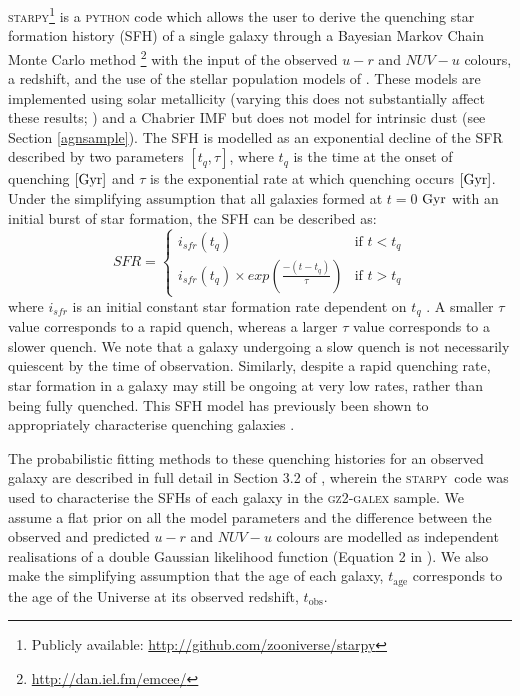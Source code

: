 \documentclass[useAMS,usenatbib]{mn2e}
\def\changed    {\color{nc} }
\def\secondchange    {\color{srv} }
\def\newref    {\color{new} }
\def\starpy ~{\textsc{starpy}}
\begin{document}
\textsc{starpy}\footnote{Publicly available: \url{http://github.com/zooniverse/starpy}} is a \textsc{python} code which allows the user to derive the {\newref quenching} star formation history (SFH) of a single galaxy through a Bayesian Markov Chain Monte Carlo method \citep{Dan}\footnote{\url{http://dan.iel.fm/emcee/}} with the input of the observed $u-r$ and $NUV-u$ colours, a redshift, and the use of the stellar population models of \cite{BC03}. {\changed These models are implemented using solar metallicity (varying this does not substantially affect these results; \citealt{Sme2015}) and a Chabrier IMF \citep{Chab03} {\secondchange but does not model for intrinsic dust (see Section \ref{agnsample})}. The SFH is modelled as an exponential decline of the SFR described by two parameters $[t_q, \tau]$, where $t_q$ is the time at the onset of quenching} $\rm{[Gyr]}$ and $\tau$ is the exponential rate at which quenching occurs $\rm{[Gyr]}$. Under the simplifying assumption that all galaxies formed at $t=0$ $\rm{ Gyr}$ with an initial burst of star formation, the SFH can be described as: 
\begin{equation}\label{sfh}
SFR =
\begin{cases}
i_{sfr}(t_q) & \text{if } t < t_q \\
i_{sfr}(t_q) \times exp{\left( \frac{-(t-t_{q})}{\tau}\right)} & \text{if } t > t_q 
\end{cases}
\end{equation}
where $i_{sfr}$ is an initial constant star formation rate dependent on $t_q$ \citep{Sch2014, Sme2015}.  A smaller $\tau$ value corresponds to a rapid quench, whereas a larger $\tau$ value corresponds to a slower quench. {\newref We note that a galaxy undergoing a slow quench is not necessarily quiescent by the time of observation. Similarly, despite a rapid quenching rate, star formation in a galaxy may still be ongoing at very low rates, rather than being fully quenched. } {\changed This SFH model has previously been shown to appropriately characterise quenching galaxies \citep{Weiner06, Martin07, Noeske07,Sch2014}.} 


The probabilistic fitting methods to these quenching histories for an observed galaxy are described in full detail in {\changed Section 3.2 of} \cite{Sme2015}, wherein the \starpy ~~code was used to characterise the SFHs of each galaxy in the \textsc{gz2-galex} sample. {\changed We assume a flat prior on all the model parameters and {\secondchange the difference between the observed and predicted $u-r$ and $NUV-u$ colours are modelled as independent realisations of a double Gaussian likelihood function} (Equation 2 in \citealt{Sme2015}).} {\secondchange We also make the simplifying assumption that the age of each galaxy, $t_\mathrm{age}$ corresponds to the age of the Universe at its observed redshift, $t_\mathrm{obs}$.} 
\end{document}
